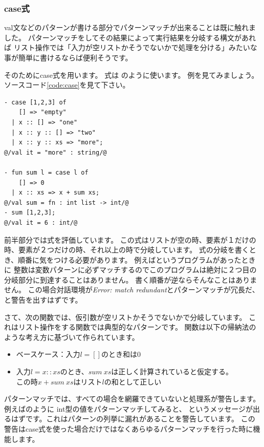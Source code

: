\documentclass[11pt,a4paper]{jarticle}
\begin{document}
\subsubsection{case式}

val文などのパターンが書ける部分でパターンマッチが出来ることは既に触れました。
パターンマッチをしてその結果によって実行結果を分岐する構文があれば
リスト操作では「入力が空リストかそうでないかで処理を分ける」みたいな事が簡単に書けるならば便利そうです。

そのためにcase式を用います。
式は
のように使います。
例を見てみましょう。ソースコード\ref{code:case}を見て下さい。

\begin{lstlisting}[caption=case式,label=code:case]
- case [1,2,3] of
    [] => "empty"
  | x :: [] => "one"
  | x :: y :: [] => "two"
  | x :: y :: xs => "more";
@/val it = "more" : string/@

- fun sum l = case l of
    [] => 0
  | x :: xs => x + sum xs;
@/val sum = fn : int list -> int/@
- sum [1,2,3];
@/val it = 6 : int/@
\end{lstlisting}

前半部分では式を評価しています。
この式はリストが空の時、要素が１だけの時、要素が２つだけの時、それ以上の時で分岐しています。
式の分岐を書くとき、順番に気をつける必要があります。
例えばというプログラムがあったときに
整数は変数パターンに必ずマッチするのでこのプログラムは絶対に２つ目の分岐部分に到達することはありません。
書く順番が逆ならそんなことはありません。
この場合対話環境が\textit{Error: match redundant}とパターンマッチが冗長だ、と警告を出すはずです。

さて、次の関数では、仮引数が空リストかそうでないかで分岐しています。
これはリスト操作をする関数では典型的なパターンです。
関数は以下の帰納法のような考え方に基づいて作られています。
\begin{itemize}
\item ベースケース：入力$l = []$のとき和は0
\item 入力$l = x :: xs$のとき、$sum \ xs$は正しく計算されていると仮定する。\\
  この時$x + sum \ xs$はリスト$l$の和として正しい
\end{itemize}

パターンマッチでは、すべての場合を網羅できていないと処理系が警告します。\\
例えばのように
int型の値をパターンマッチしてみると、
というメッセージが出るはずです。これはパターンの列挙に漏れがあることを警告しています。
この警告はcase式を使った場合だけではなくあらゆるパターンマッチを行った時に機能します。
\end{document}
